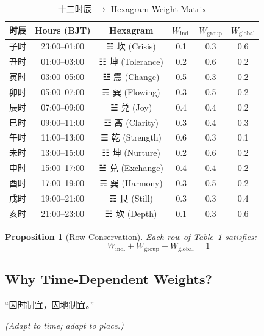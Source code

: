 \documentclass[conference]{IEEEtran}
\newtheorem{proposition}{Proposition}
\begin{document}
\begin{table}[t]
\centering
\caption{十二时辰 $\to$ Hexagram Weight Matrix}
\label{tab:hexagram}
\renewcommand{\arraystretch}{1.2}
\begin{tabular}{lccccc}
\toprule
\textbf{时辰} & \textbf{Hours (BJT)}
  & \textbf{Hexagram}
  & $W_{\text{ind.}}$
  & $W_{\text{group}}$
  & $W_{\text{global}}$ \\
\midrule
子时 & 23:00--01:00 & ☵ 坎 (Crisis)   & 0.1 & 0.3 & 0.6 \\
丑时 & 01:00--03:00 & ☷ 坤 (Tolerance) & 0.2 & 0.6 & 0.2 \\
寅时 & 03:00--05:00 & ☳ 震 (Change)    & 0.5 & 0.3 & 0.2 \\
卯时 & 05:00--07:00 & ☴ 巽 (Flowing)   & 0.3 & 0.5 & 0.2 \\
辰时 & 07:00--09:00 & ☱ 兑 (Joy)       & 0.4 & 0.4 & 0.2 \\
巳时 & 09:00--11:00 & ☲ 离 (Clarity)   & 0.3 & 0.4 & 0.3 \\
午时 & 11:00--13:00 & ☰ 乾 (Strength)  & 0.6 & 0.3 & 0.1 \\
未时 & 13:00--15:00 & ☷ 坤 (Nurture)   & 0.2 & 0.6 & 0.2 \\
申时 & 15:00--17:00 & ☱ 兑 (Exchange)  & 0.4 & 0.4 & 0.2 \\
酉时 & 17:00--19:00 & ☴ 巽 (Harmony)   & 0.3 & 0.5 & 0.2 \\
戌时 & 19:00--21:00 & ☶ 艮 (Still)     & 0.3 & 0.3 & 0.4 \\
亥时 & 21:00--23:00 & ☵ 坎 (Depth)     & 0.1 & 0.3 & 0.6 \\
\bottomrule
\end{tabular}
\end{table}

\begin{proposition}[Row Conservation]
Each row of Table~\ref{tab:hexagram} satisfies:
\begin{equation}
  W_{\text{ind.}} + W_{\text{group}}
  + W_{\text{global}} = 1
  \label{eq:row-sum}
\end{equation}
\end{proposition}

\subsection{Why Time-Dependent Weights?}

``因时制宜，因地制宜。''

\noindent\textit{(Adapt to time; adapt to place.)}
\end{document}

